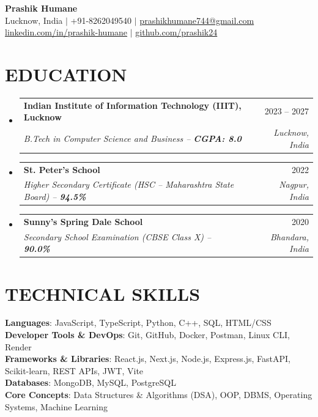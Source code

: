 \documentclass[letterpaper,10.5pt]{article}
\makeatletter
\newcommand{\resumeSubheading}[4]{
  \vspace{-1.5pt}\item
    \begin{tabular*}{0.99\textwidth}[t]{l@{\extracolsep{\fill}}r}
      \textbf{#1} & #2 \\
      \textit{\small#3} & \textit{\small #4} \\
    \end{tabular*}\vspace{-5pt}
}
\newcommand{\resumeSubHeadingListStart}{\begin{itemize}[leftmargin=0.15in, label={}]}
\newcommand{\resumeSubHeadingListEnd}{\end{itemize}}
\makeatother
\begin{document}
\begin{center}
    {\Huge \textbf{Prashik Humane}} \\ \vspace{4pt}
    \small 
    \faMapMarker* \hspace{0.5pt} Lucknow, India \hspace{3pt} $|$ \hspace{3pt}
    \faPhone* \hspace{0.5pt} +91-8262049540 \hspace{3pt} $|$ \hspace{3pt}
    \faEnvelope \hspace{0.5pt} \href{mailto:prashikhumane744@gmail.com}{prashikhumane744@gmail.com} \\ \vspace{2pt}
    \faLinkedin \hspace{0.5pt} \href{https://linkedin.com/in/prashik-humane}{linkedin.com/in/prashik-humane} \hspace{3pt} $|$ \hspace{3pt}
    \faGithub \hspace{0.5pt} \href{https://github.com/prashik24}{github.com/prashik24}
    \vspace{-4pt}
\end{center}

\section{EDUCATION}
  \resumeSubHeadingListStart
    \resumeSubheading
      {Indian Institute of Information Technology (IIIT), Lucknow}{2023 -- 2027}
      {B.Tech in Computer Science and Business -- \textbf{CGPA: 8.0}}{Lucknow, India}
    \resumeSubheading
      {St. Peter's School}{2022}
      {Higher Secondary Certificate (HSC -- Maharashtra State Board) -- \textbf{94.5\%}}{Nagpur, India}
    \resumeSubheading
      {Sunny's Spring Dale School}{2020}
      {Secondary School Examination (CBSE Class X) -- \textbf{90.0\%}}{Bhandara, India}
  \resumeSubHeadingListEnd

\section{TECHNICAL SKILLS}
 \begin{itemize}[leftmargin=0.15in, label={}]
    \small{\item{
     \textbf{Languages}: JavaScript, TypeScript, Python, C++, SQL, HTML/CSS \\
     \textbf{Developer Tools \& DevOps}: Git, GitHub, Docker, Postman, Linux CLI, Render \\
     \textbf{Frameworks \& Libraries}: React.js, Next.js, Node.js, Express.js, FastAPI, Scikit-learn, REST APIs, JWT, Vite \\
     \textbf{Databases}: MongoDB, MySQL, PostgreSQL \\
     \textbf{Core Concepts}: Data Structures \& Algorithms (DSA), OOP, DBMS, Operating Systems, Machine Learning
    }}
 \end{itemize}
 \vspace{-14pt}
\end{document}
